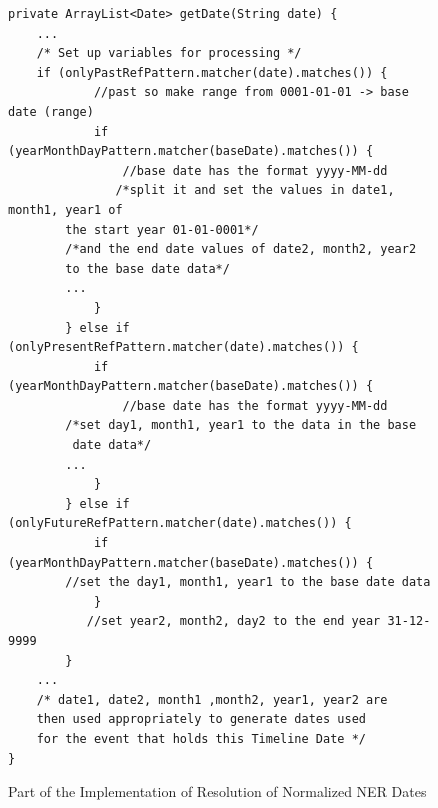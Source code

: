\begin{figure}[H]
\begin{lstlisting}
private ArrayList<Date> getDate(String date) {
	...
	/* Set up variables for processing */
	if (onlyPastRefPattern.matcher(date).matches()) {
            //past so make range from 0001-01-01 -> base date (range)
            if (yearMonthDayPattern.matcher(baseDate).matches()) {
                //base date has the format yyyy-MM-dd
               /*split it and set the values in date1, month1, year1 of 
		the start year 01-01-0001*/
		/*and the end date values of date2, month2, year2 
		to the base date data*/
		...
            }
        } else if (onlyPresentRefPattern.matcher(date).matches()) {
            if (yearMonthDayPattern.matcher(baseDate).matches()) {
                //base date has the format yyyy-MM-dd
		/*set day1, month1, year1 to the data in the base
		 date data*/
		...
            }
        } else if (onlyFutureRefPattern.matcher(date).matches()) {
            if (yearMonthDayPattern.matcher(baseDate).matches()) {
		//set the day1, month1, year1 to the base date data
            }
           //set year2, month2, day2 to the end year 31-12-9999
        }
	...
	/* date1, date2, month1 ,month2, year1, year2 are 
	then used appropriately to generate dates used 
	for the event that holds this Timeline Date */
}
\end{lstlisting}
\caption{Part of the Implementation of Resolution of Normalized NER Dates}
\label{fig:refCode}
\end{figure}

